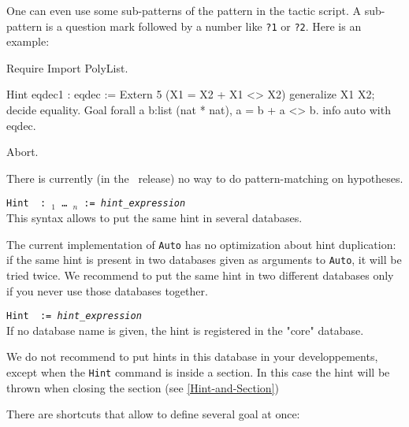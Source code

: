 \begin{itemize}
  One can even use some sub-patterns of the pattern in the tactic
  script. A sub-pattern is a question mark followed by a number like
  \texttt{?1} or \texttt{?2}. Here is an example:

\begin{coq_example*}
Require Import PolyList.
\end{coq_example*}
\begin{coq_example}
Hint eqdec1 : eqdec := Extern 5   ({X1 = X2} + {X1 <> X2})
 generalize X1 X2; decide equality.
Goal 
forall a b:list (nat * nat), {a = b} + {a <> b}.
info auto with eqdec.
\end{coq_example}
\begin{coq_eval}
Abort.
\end{coq_eval}

\end{itemize}

\Rem There is currently (in the \coqversion\ release) no way to do
pattern-matching on hypotheses.

\begin{Variants}
\item \texttt{Hint \ident\ : \ident$_1$ \dots\ \ident$_n$ :=
    \textsl{hint\_expression}}\\
  This syntax allows to put the same hint in several databases.

  \Rem The current implementation of \texttt{Auto} has no
  optimization about hint duplication: 
  if the same hint is present in two databases 
  given as arguments to \texttt{Auto}, it will be tried twice. We
  recommend to put the same hint in two different databases only if you
  never use those databases together.

\item\texttt{Hint \ident\ := \textsl{hint\_expression}}\\
    If no database name is given, the hint is registered in the "core" 
    database. 

    \Rem We do not recommend to put hints in this database in your
    developpements, except when the \texttt{Hint} command
    is inside a section. In this case the hint will be thrown when
    closing the section (see \ref{Hint-and-Section})
    
\end{Variants}

There are shortcuts that allow to define several goal at once:

